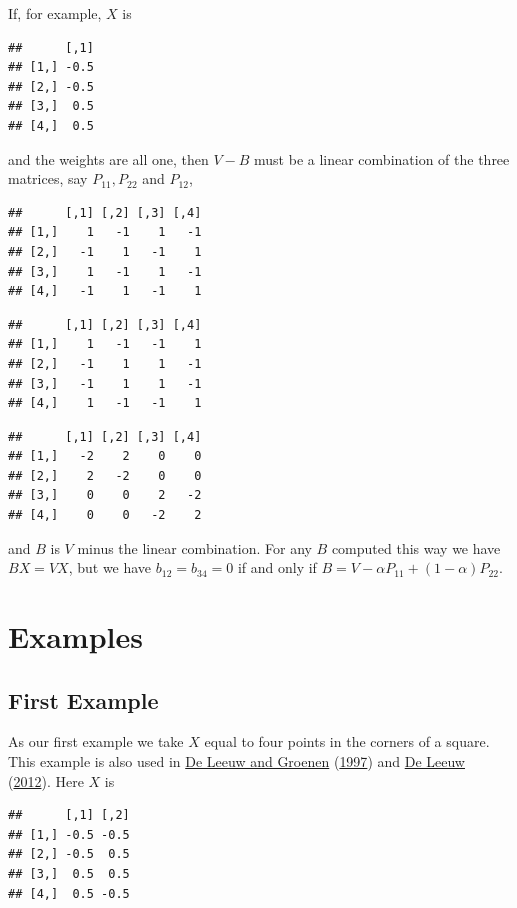 \documentclass[
  12pt,
]{book}
\theoremstyle{definition}
\theoremstyle{definition}
\theoremstyle{definition}
\theoremstyle{definition}
\theoremstyle{remark}
\begin{document}
If, for example, \(X\) is

\begin{verbatim}
##      [,1]
## [1,] -0.5
## [2,] -0.5
## [3,]  0.5
## [4,]  0.5
\end{verbatim}

and the weights are all one,
then \(V-B\) must be a linear combination of the three matrices, say \(P_{11}, P_{22}\) and \(P_{12}\),

\begin{verbatim}
##      [,1] [,2] [,3] [,4]
## [1,]    1   -1    1   -1
## [2,]   -1    1   -1    1
## [3,]    1   -1    1   -1
## [4,]   -1    1   -1    1
\end{verbatim}

\begin{verbatim}
##      [,1] [,2] [,3] [,4]
## [1,]    1   -1   -1    1
## [2,]   -1    1    1   -1
## [3,]   -1    1    1   -1
## [4,]    1   -1   -1    1
\end{verbatim}

\begin{verbatim}
##      [,1] [,2] [,3] [,4]
## [1,]   -2    2    0    0
## [2,]    2   -2    0    0
## [3,]    0    0    2   -2
## [4,]    0    0   -2    2
\end{verbatim}

and \(B\) is \(V\) minus the linear combination. For any \(B\) computed this way we have \(BX=VX\), but we have
\(b_{12}=b_{34}=0\) if and only if \(B=V-\alpha P_{11} + (1-\alpha) P_{22}\).

\hypertarget{examples-1}{%
\section{Examples}\label{examples-1}}

\hypertarget{first-example}{%
\subsection{First Example}\label{first-example}}

As our first example we take \(X\) equal to four points in the corners of a square. This example is also used in \protect\hyperlink{ref-deleeuw_groenen_A_97}{De Leeuw and Groenen} (\protect\hyperlink{ref-deleeuw_groenen_A_97}{1997}) and \protect\hyperlink{ref-deleeuw_U_12b}{De Leeuw} (\protect\hyperlink{ref-deleeuw_U_12b}{2012}). Here \(X\) is

\begin{verbatim}
##      [,1] [,2]
## [1,] -0.5 -0.5
## [2,] -0.5  0.5
## [3,]  0.5  0.5
## [4,]  0.5 -0.5
\end{verbatim}
\end{document}
